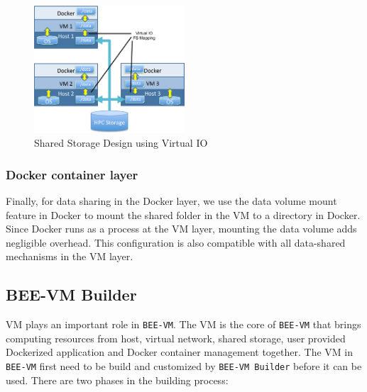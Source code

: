 \begin{figure}[h]
    \centering
    \includegraphics[width=0.5\textwidth]{figures/fs3.pdf}
    \caption{Shared Storage Design using Virtual IO}
    \label{fs3}
\end{figure}

\subsubsection{Docker container layer}
Finally, for data sharing in the Docker layer, we use the data volume mount feature in Docker to mount the shared folder in the VM to a directory in Docker. Since Docker runs as a process at the VM layer, mounting the data volume adds negligible overhead. This configuration is also compatible with all data-shared mechanisms in the VM layer.

\subsection{BEE-VM Builder}
VM plays an important role in \texttt{BEE-VM}. The VM is the core of \texttt{BEE-VM} that brings computing resources from host, virtual network, shared storage, user provided Dockerized application and Docker container management together. The VM in \texttt{BEE-VM} first need to be build and customized by \texttt{BEE-VM Builder} before it can be used. There are two phases in the building process:

